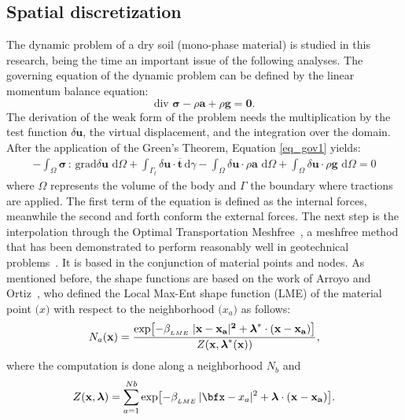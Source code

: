 \documentclass[applsci,journal,article,submit,moreauthors,pdftex]{Definitions/mdpi}
\newcommand{\differential}[1]
{\mathrm{d}#1}
\begin{document}
\subsection{Spatial discretization}
The dynamic problem of a dry soil (mono-phase material) is studied in this research, being the time an important issue of the following analyses. The governing equation of the dynamic problem can be defined by the linear momentum balance equation:
\begin{equation}\label{eq_gov1}
 \mbox{div } \boldsymbol{\sigma}-\rho\boldsymbol{a}+\rho\boldsymbol{g}=\boldsymbol{0}.
\end{equation}
The derivation of the weak form of the problem needs the multiplication by the test function $\delta \boldsymbol{u}$, the virtual displacement, and the integration over the domain. After the application of the Green's Theorem, Equation \eqref{eq_gov1} yields:
\begin{eqnarray} \label{eq_gov1_a}
-\int_\Omega \boldsymbol{ \sigma} \, : \, \mbox{grad} \delta\boldsymbol{u} \,\, \differential{\Omega} + \int_{\Gamma_{t}} \delta\boldsymbol{u} \cdot\boldsymbol{\overline{t}} \, \differential \gamma - \int_\Omega \delta\boldsymbol{u} \cdot  \rho\boldsymbol{a}  \,\, \differential{\Omega} + \int_\Omega \delta\boldsymbol{u} \cdot 
\rho\boldsymbol{g}  \,\, \differential{\Omega}= 0 
\end{eqnarray}
where $\Omega$ represents the volume of the body and $\Gamma$ the boundary where tractions are applied. The first term of the equation is defined as the internal forces, meanwhile the second and forth conform the external forces. The next step is the interpolation through the Optimal Transportation Meshfree~\cite{li2010,li2014,Huang2019}, a meshfree method that has been demonstrated to perform reasonably well in geotechnical problems~\cite{Navas2020,Navas2021}. It is based in the conjunction of material points and nodes. As mentioned before, the shape functions are based on the work of Arroyo and Ortiz~\cite{arroyo2006}, who defined the Local Max-Ent shape function (LME) of the material point $\boldsymbol(x)$ with respect to the neighborhood $\boldsymbol(x_a)$ as follows:
\begin{equation} \label{eq_N1}
N_a(\textbf{x})=\frac{\exp\left[ -\beta_{_{LME}} \; |\bf{x-x_a}|^2 +  \boldsymbol{\lambda}^*  \cdot  (x-x_a)  \right] } {Z(\textbf{x},\boldsymbol{\lambda}^*(\textbf{x}))},
\end{equation}
where the computation is done along a neighborhood $N_b$ and 
\begin{equation}\label{eq_N2}
Z({\bf x}, {\boldsymbol{\lambda}}) = \sum_{a=1}^{Nb} \exp \left[ -\beta_{_{LME}} \, |{\bfx-x_a}|^2 + \boldsymbol{\lambda}  \cdot  {\bf(x-x_a)}         \right].
\end{equation}
\end{document}

